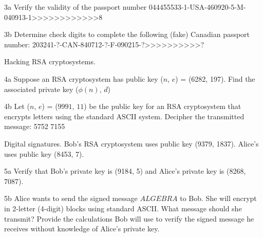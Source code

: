 \begin{question}{3a}
Verify the validity of the passport number
044455533-1-USA-460920-5-M-040913-1>>>>>>>>>>>>8
\end{question}

\begin{question}{3b}
Determine check digits to complete the following (fake) Canadian passport number:
203241-?-CAN-840712-?-F-090215-?>>>>>>>>>>?
\end{question}


\begin{question}{4}
Hacking RSA cryptosystems.
\end{question}

\begin{question}{4a}
Suppose an RSA cryptosystem has public key ($n$, $e$) = (6282, 197). Find the associated private key ($\phi(n)$, $d$)
\end{question}

\begin{question}{4b}
Let ($n$, $e$) = ($9991$, $11$) be the public key for an RSA cryptosystem that encrypts
letters using the standard ASCII system. Decipher the transmitted message: 5752 7155
\end{question}


\begin{question}{5}
Digital signatures. Bob's RSA cryptosystem uses public key (9379, 1837). Alice's uses
public key (8453, 7).
\end{question}

\begin{question}{5a}
Verify that Bob's private key is (9184, 5) and Alice's private key is (8268, 7087).
\end{question}

\begin{question}{5b}
Alice wants to send the signed message $ALGEBRA$ to Bob. She will encrypt in
2-letter (4-digit) blocks using standard ASCII. What message should she transmit? Provide
the calculations Bob will use to verify the signed message he receives without knowledge of
Alice's private key.
\end{question}


